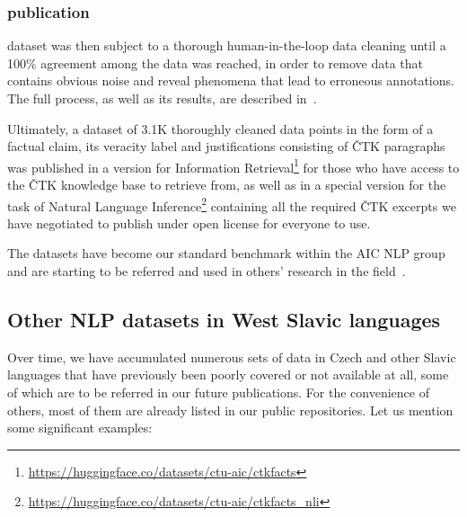 \subsubsection{\CTK publication}
\CTK dataset was then subject to a thorough human-in-the-loop data cleaning until a 100\% agreement among the data was reached, in order to remove data that contains obvious noise and reveal phenomena that lead to erroneous annotations.
The full process, as well as its results, are described in~\cite{lrev}.

Ultimately, a dataset of 3.1K thoroughly cleaned data points in the form of a factual claim, its veracity label and justifications consisting of ČTK paragraphs was published in a version for Information Retrieval\footnote{\url{https://huggingface.co/datasets/ctu-aic/ctkfacts}} for those who have access to the ČTK knowledge base to retrieve from, as well as in a special version for the task of Natural Language Inference\footnote{\url{https://huggingface.co/datasets/ctu-aic/ctkfacts_nli}} containing all the required ČTK excerpts we have negotiated to publish under open license for everyone to use.

The datasets have become our standard benchmark within the AIC NLP group~\cite{semin,mlynar} and are starting to be referred and used in others' research in the field~\cite{stefanik}.

\subsection{Other NLP datasets in West Slavic languages}
Over time, we have accumulated numerous sets of data in Czech and other Slavic languages that have previously been poorly covered or not available at all, some of which are to be referred in our future publications.
For the convenience of others, most of them are already listed in our public repositories.
Let us mention some significant examples:

